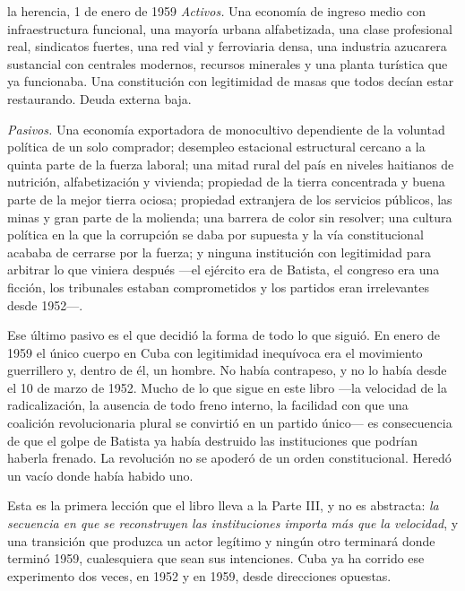 \begin{ledger}{la herencia, 1 de enero de 1959}
\emph{Activos.} Una economía de ingreso medio con infraestructura funcional, una
mayoría urbana alfabetizada, una clase profesional real, sindicatos fuertes, una
red vial y ferroviaria densa, una industria azucarera sustancial con centrales
modernos, recursos minerales y una planta turística que ya funcionaba. Una
constitución con legitimidad de masas que todos decían estar restaurando. Deuda
externa baja.

\emph{Pasivos.} Una economía exportadora de monocultivo dependiente de la
voluntad política de un solo comprador; desempleo estacional estructural cercano
a la quinta parte de la fuerza laboral; una mitad rural del país en niveles
haitianos de nutrición, alfabetización y vivienda; propiedad de la tierra
concentrada y buena parte de la mejor tierra ociosa; propiedad extranjera de los
servicios públicos, las minas y gran parte de la molienda; una barrera de color
sin resolver; una cultura política en la que la corrupción se daba por supuesta y
la vía constitucional acababa de cerrarse por la fuerza; y ninguna institución
con legitimidad para arbitrar lo que viniera después ---el ejército era de
Batista, el congreso era una ficción, los tribunales estaban comprometidos y los
partidos eran irrelevantes desde 1952---.
\end{ledger}

Ese último pasivo es el que decidió la forma de todo lo que siguió. En enero de
1959 el único cuerpo en Cuba con legitimidad inequívoca era el movimiento
guerrillero y, dentro de él, un hombre. No había contrapeso, y no lo había desde
el 10 de marzo de 1952. Mucho de lo que sigue en este libro ---la velocidad de la
radicalización, la ausencia de todo freno interno, la facilidad con que una
coalición revolucionaria plural se convirtió en un partido único--- es
consecuencia de que el golpe de Batista ya había destruido las instituciones que
podrían haberla frenado. La revolución no se apoderó de un orden constitucional.
Heredó un vacío donde había habido uno.

Esta es la primera lección que el libro lleva a la Parte III, y no es abstracta:
\emph{la secuencia en que se reconstruyen las instituciones importa más que la
velocidad}, y una transición que produzca un actor legítimo y ningún otro
terminará donde terminó 1959, cualesquiera que sean sus intenciones. Cuba ya ha
corrido ese experimento dos veces, en 1952 y en 1959, desde direcciones opuestas.
